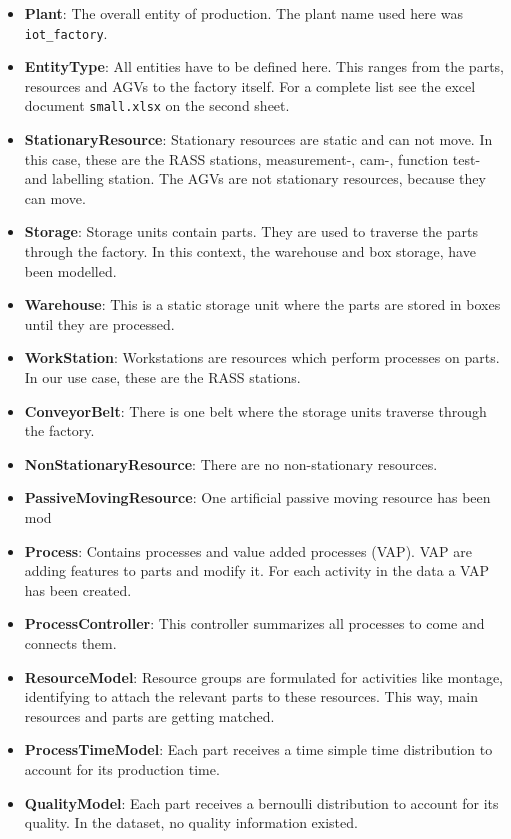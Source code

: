 \begin{itemize}
  \item \textbf{Plant}: The overall entity of production. The plant name used here was \texttt{iot\_factory}.
  \item \textbf{EntityType}: All entities have to be defined here. This ranges from the parts, resources and AGVs to the factory itself. For a complete list see the excel document \texttt{small.xlsx} on the second sheet.
  \item \textbf{StationaryResource}: Stationary resources are static and can not move. In this case, these are the RASS stations, measurement-, cam-, function test- and labelling station. The AGVs are not stationary resources, because they can move.
  \item \textbf{Storage}: Storage units contain parts. They are used to traverse the parts through the factory. In this context, the warehouse and box storage, have been modelled.
  \item \textbf{Warehouse}: This is a static storage unit where the parts are stored in boxes until they are processed.
  \item \textbf{WorkStation}: Workstations are resources which perform processes on parts. In our use case, these are the RASS stations.
  \item \textbf{ConveyorBelt}: There is one belt where the storage units traverse through the factory.
  \item \textbf{NonStationaryResource}: There are no non-stationary resources.
  \item \textbf{PassiveMovingResource}: One artificial passive moving resource has been mod
  \item \textbf{Process}: Contains processes and value added processes (VAP). VAP are adding features to parts and modify it. For each activity in the data a VAP has been created.
  \item \textbf{ProcessController}: This controller summarizes all processes to come and connects them.
  \item \textbf{ResourceModel}: Resource groups are formulated for activities like montage, identifying to attach the relevant parts to these resources. This way, main resources and parts are getting matched.
  \item \textbf{ProcessTimeModel}: Each part receives a time simple time distribution to account for its production time.
  \item \textbf{QualityModel}: Each part receives a bernoulli distribution to account for its quality. In the dataset, no quality information existed.

\end{itemize}
